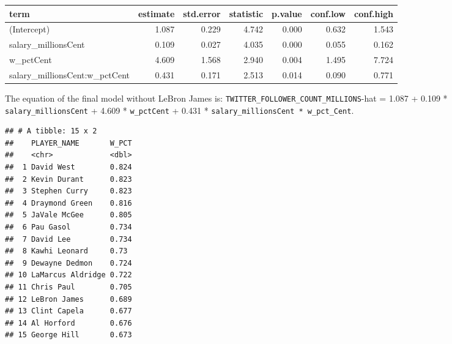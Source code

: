 \documentclass[]{article}
\newenvironment{Shaded}{\begin{snugshade}}{\end{snugshade}}
\newcommand{\DataTypeTok}[1]{\textcolor[rgb]{0.13,0.29,0.53}{#1}}
\newcommand{\DecValTok}[1]{\textcolor[rgb]{0.00,0.00,0.81}{#1}}
\newcommand{\KeywordTok}[1]{\textcolor[rgb]{0.13,0.29,0.53}{\textbf{#1}}}
\newcommand{\NormalTok}[1]{#1}
\newcommand{\OperatorTok}[1]{\textcolor[rgb]{0.81,0.36,0.00}{\textbf{#1}}}
\newcommand{\OtherTok}[1]{\textcolor[rgb]{0.56,0.35,0.01}{#1}}
\newcommand{\StringTok}[1]{\textcolor[rgb]{0.31,0.60,0.02}{#1}}
\begin{document}
\begin{Shaded}
\end{Shaded}

\begin{longtable}[]{@{}lrrrrrr@{}}
\toprule
term & estimate & std.error & statistic & p.value & conf.low &
conf.high\tabularnewline
\midrule
\endhead
(Intercept) & 1.087 & 0.229 & 4.742 & 0.000 & 0.632 &
1.543\tabularnewline
salary\_millionsCent & 0.109 & 0.027 & 4.035 & 0.000 & 0.055 &
0.162\tabularnewline
w\_pctCent & 4.609 & 1.568 & 2.940 & 0.004 & 1.495 &
7.724\tabularnewline
salary\_millionsCent:w\_pctCent & 0.431 & 0.171 & 2.513 & 0.014 & 0.090
& 0.771\tabularnewline
\bottomrule
\end{longtable}

The equation of the final model without LeBron James is:
\texttt{TWITTER\_FOLLOWER\_COUNT\_MILLIONS}-hat = 1.087 + 0.109 *
\texttt{salary\_millionsCent} + 4.609 * \texttt{w\_pctCent} + 0.431 *
\texttt{salary\_millionsCent\ *\ w\_pct\_Cent}.

\begin{Shaded}
\end{Shaded}

\begin{verbatim}
## # A tibble: 15 x 2
##    PLAYER_NAME       W_PCT
##    <chr>             <dbl>
##  1 David West        0.824
##  2 Kevin Durant      0.823
##  3 Stephen Curry     0.823
##  4 Draymond Green    0.816
##  5 JaVale McGee      0.805
##  6 Pau Gasol         0.734
##  7 David Lee         0.734
##  8 Kawhi Leonard     0.73 
##  9 Dewayne Dedmon    0.724
## 10 LaMarcus Aldridge 0.722
## 11 Chris Paul        0.705
## 12 LeBron James      0.689
## 13 Clint Capela      0.677
## 14 Al Horford        0.676
## 15 George Hill       0.673
\end{verbatim}
\end{document}
